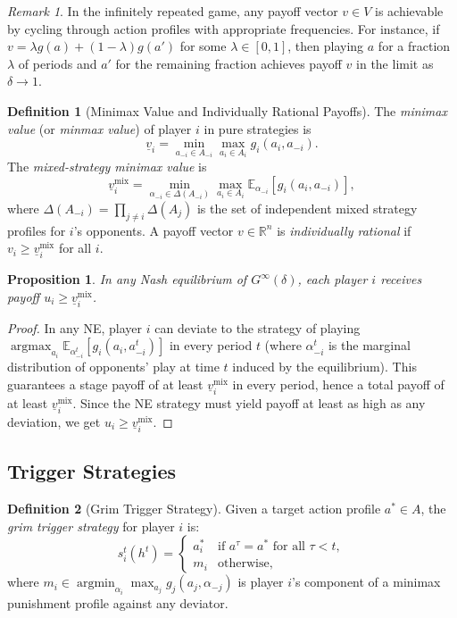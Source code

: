 \documentclass[11pt,a4paper]{article}
\theoremstyle{definition}
\newtheorem{definition}{Definition}[section]
\theoremstyle{plain}
\newtheorem{proposition}[theorem]{Proposition}
\theoremstyle{remark}
\newtheorem{remark}{Remark}[section]
\newcommand{\R}{\mathbb{R}}
\newcommand{\E}{\mathbb{E}}
\DeclareMathOperator{\argmax}{argmax}
\DeclareMathOperator{\argmin}{argmin}
\begin{document}
\begin{remark}
In the infinitely repeated game, any payoff vector $v \in V$ is achievable by cycling
through action profiles with appropriate frequencies. For instance, if $v = \lambda g(a) +
(1-\lambda) g(a')$ for some $\lambda \in [0,1]$, then playing $a$ for a fraction $\lambda$
of periods and $a'$ for the remaining fraction achieves payoff $v$ in the limit as
$\delta \to 1$.
\end{remark}

\begin{definition}[Minimax Value and Individually Rational Payoffs]
\label{def:minimax-ir}
The \emph{minimax value} (or \emph{minmax value}) of player $i$ in pure strategies is
\[
    \underline{v}_i = \min_{a_{-i} \in A_{-i}} \max_{a_i \in A_i} g_i(a_i, a_{-i}).
\]
The \emph{mixed-strategy minimax value} is
\[
    \underline{v}_i^{\text{mix}} = \min_{\alpha_{-i} \in \Delta(A_{-i})} \max_{a_i \in A_i}
    \E_{\alpha_{-i}}[g_i(a_i, a_{-i})],
\]
where $\Delta(A_{-i}) = \prod_{j \neq i} \Delta(A_j)$ is the set of independent mixed
strategy profiles for $i$'s opponents. A payoff vector $v \in \R^n$ is
\emph{individually rational} if $v_i \geq \underline{v}_i^{\text{mix}}$ for all $i$.
\end{definition}

\begin{proposition}
\label{prop:ne-payoff-lower-bound}
In any Nash equilibrium of $G^\infty(\delta)$, each player $i$ receives payoff
$u_i \geq \underline{v}_i^{\text{mix}}$.
\end{proposition}

\begin{proof}
In any NE, player $i$ can deviate to the strategy of playing
$\argmax_{a_i} \E_{\alpha_{-i}^t}[g_i(a_i, a_{-i}^t)]$ in every period $t$ (where
$\alpha_{-i}^t$ is the marginal distribution of opponents' play at time $t$ induced by the
equilibrium). This guarantees a stage payoff of at least $\underline{v}_i^{\text{mix}}$ in
every period, hence a total payoff of at least $\underline{v}_i^{\text{mix}}$.
Since the NE strategy must yield payoff at least as high as any deviation, we get
$u_i \geq \underline{v}_i^{\text{mix}}$.
\end{proof}

\subsection{Trigger Strategies}

\begin{definition}[Grim Trigger Strategy]
\label{def:grim-trigger}
Given a target action profile $a^* \in A$, the \emph{grim trigger strategy} for player $i$
is:
\[
    s_i^t(h^t) = \begin{cases}
        a_i^* & \text{if } a^\tau = a^* \text{ for all } \tau < t, \\
        m_i   & \text{otherwise},
    \end{cases}
\]
where $m_i \in \argmin_{\alpha_i} \max_{a_j} g_j(a_j, \alpha_{-j})$ is player $i$'s
component of a minimax punishment profile against any deviator.
\end{definition}
\end{document}
